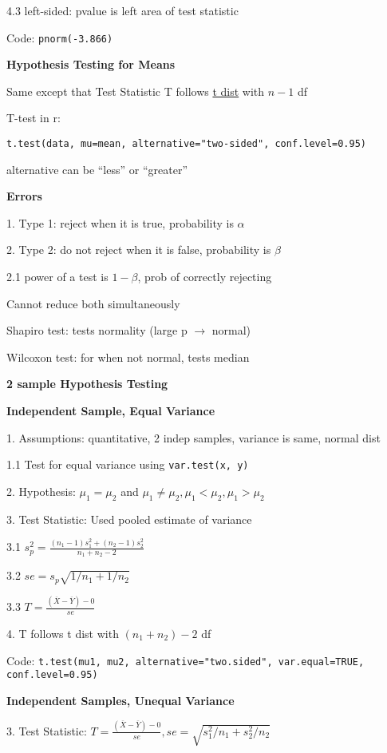 \documentclass[10pt, a4paper]{article}
\newcommand{\tab}[0]{\hspace*{2mm}}
\begin{document}
\begin{multicols*}{3}
		\tab{} 4.3 left-sided: pvalue is left area of test statistic

		\tab{} Code: \texttt{pnorm(-3.866)}

		\textbf{Hypothesis Testing for Means}

		Same except that Test Statistic T follows \underline{t dist} with $n -1$ df

		T-test in r:

		\texttt{t.test(data, mu=mean, alternative="two-sided", conf.level=0.95)}
		
		alternative can be ``less'' or ``greater''

		\textbf{Errors}

		1. Type 1: reject when it is true, probability is $\alpha$

		2. Type 2: do not reject when it is false, probability is $\beta$

		\tab{} 2.1 power of a test is $1 - \beta$, prob of correctly rejecting 

		Cannot reduce both simultaneously 

		Shapiro test: tests normality (large p $\rightarrow$ normal)

		Wilcoxon test: for when not normal, tests median

		\textbf{2 sample Hypothesis Testing}

		\textbf{Independent Sample, Equal Variance}

		1. Assumptions: quantitative, 2 indep samples, variance is same, normal dist

		\tab{} 1.1 Test for equal variance using \texttt{var.test(x, y)}

		2. Hypothesis: $\mu_1 = \mu_2$ and $\mu_1 \neq \mu_2, \mu_1 < \mu_2, \mu_1 > \mu_2$

		3. Test Statistic: Used pooled estimate of variance

		\tab{} 3.1 $s_p^2 = \frac{(n_1 - 1)s_1^2 + (n_2 - 1)s_2^2}{n_1 + n_2 -2}$

		\tab{} 3.2 $se = s_p \sqrt{1/n_1 + 1/n_2}$

		\tab{} 3.3 $T = \frac{(\overline{X} - \overline{Y}) - 0}{se}$

		4. T follows t dist with $(n_1 + n_2) - 2$ df

		Code: \texttt{t.test(mu1, mu2, alternative="two.sided", var.equal=TRUE, conf.level=0.95)}
		
		\textbf{Independent Samples, Unequal Variance}

		3. Test Statistic: $T = \frac{(\overline{X} - \overline{Y}) - 0}{se}, se=\sqrt{s_1^2/n_1 + s_2^2 / n_2}$


\end{multicols*}
\end{document}
